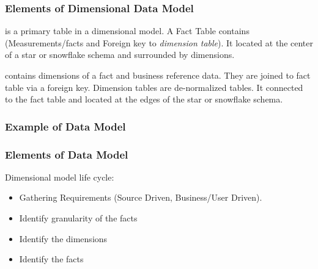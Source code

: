 \begin{frame}
    \frametitle{Elements of Dimensional Data Model}
    \begin{description}[<+->]
        \item[Fact Table] is a primary table in a dimensional model. A Fact Table contains (Measurements/facts and Foreign key to \textit{dimension table}). It located at the center of a star or snowflake schema and surrounded by dimensions.
        \item[Dimension table] contains dimensions of a fact and business reference data. They are joined to fact table via a foreign key. Dimension tables are de-normalized tables. It connected to the fact table and located at the edges of the star or snowflake schema.

    \end{description}
\end{frame}

\begin{frame}
    \frametitle{Example of Data Model}

    
\end{frame}

\begin{frame}
	\frametitle{Elements of Data Model}
		Dimensional model life cycle:
	    \begin{itemize}[<+->]
			\item Gathering Requirements (Source Driven, Business/User Driven).
			\item Identify granularity of the facts
			\item Identify the dimensions
			\item Identify the facts
	    \end{itemize}	
\end{frame}

